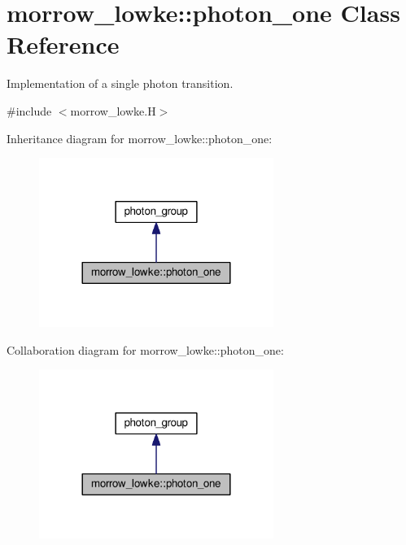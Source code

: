 \hypertarget{classmorrow__lowke_1_1photon__one}{}\section{morrow\+\_\+lowke\+:\+:photon\+\_\+one Class Reference}
\label{classmorrow__lowke_1_1photon__one}


Implementation of a single photon transition.  




{\ttfamily \#include $<$morrow\+\_\+lowke.\+H$>$}



Inheritance diagram for morrow\+\_\+lowke\+:\+:photon\+\_\+one\+:\nopagebreak
\begin{figure}[H]
\begin{center}
\leavevmode
\includegraphics[width=216pt]{classmorrow__lowke_1_1photon__one__inherit__graph}
\end{center}
\end{figure}


Collaboration diagram for morrow\+\_\+lowke\+:\+:photon\+\_\+one\+:\nopagebreak
\begin{figure}[H]
\begin{center}
\leavevmode
\includegraphics[width=216pt]{classmorrow__lowke_1_1photon__one__coll__graph}
\end{center}
\end{figure}
